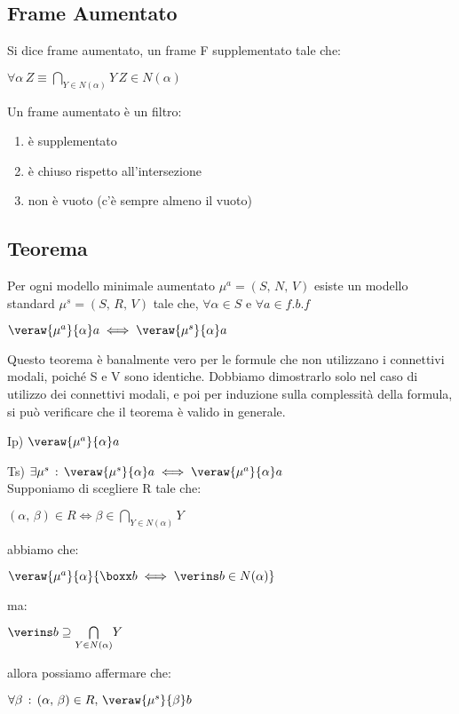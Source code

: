 \subsection{Frame Aumentato}

Si dice frame aumentato, un frame F supplementato tale che:

$\forall\alpha\, Z\equiv\underset{Y\in N(\alpha)}{\bigcap}Y\, Z\in N(\alpha)$	

Un frame aumentato è un filtro:
\begin{enumerate}
\item è supplementato
\item è chiuso rispetto all'intersezione
\item non è vuoto (c'è sempre almeno il vuoto)
\end{enumerate}

\subsection{Teorema}

Per ogni modello minimale aumentato $\mu^{a}=(S,\, N,\, V)$ esiste
un modello standard $\mu^{s}=(S,\, R,\, V)$ tale che, $\forall\alpha\in S$
e $\forall a\in f.b.f$

$\veraw{\mu^{a}}{\alpha}a\iff\veraw{\mu^{s}}{\alpha}a$

Questo teorema è banalmente vero per le formule che non utilizzano
i connettivi modali, poiché S e V sono identiche. Dobbiamo dimostrarlo
solo nel caso di utilizzo dei connettivi modali, e poi per induzione
sulla complessità della formula, si può verificare che il teorema
è valido in generale.

Ip) $\veraw{\mu^{a}}{\alpha}a$

Ts) $\exists\mu^{s}\,:\,\veraw{\mu^{s}}{\alpha}a\iff\veraw{\mu^{a}}{\alpha}a$\\


Supponiamo di scegliere R tale che:

$(\alpha,\,\beta)\in R\iff\beta\in\underset{Y\in N(\alpha)}{\bigcap}Y$

abbiamo che:

$\veraw{\mu^{a}}{\alpha}{\boxx b\iff\verins b\in N(\alpha)}$

ma:

$\verins b\supseteq\underset{Y\in N(\alpha)}{\bigcap}Y$

allora possiamo affermare che:

$\forall\beta\,:\,(\alpha,\,\beta)\in R,\,\veraw{\mu^{s}}{\beta}b$

